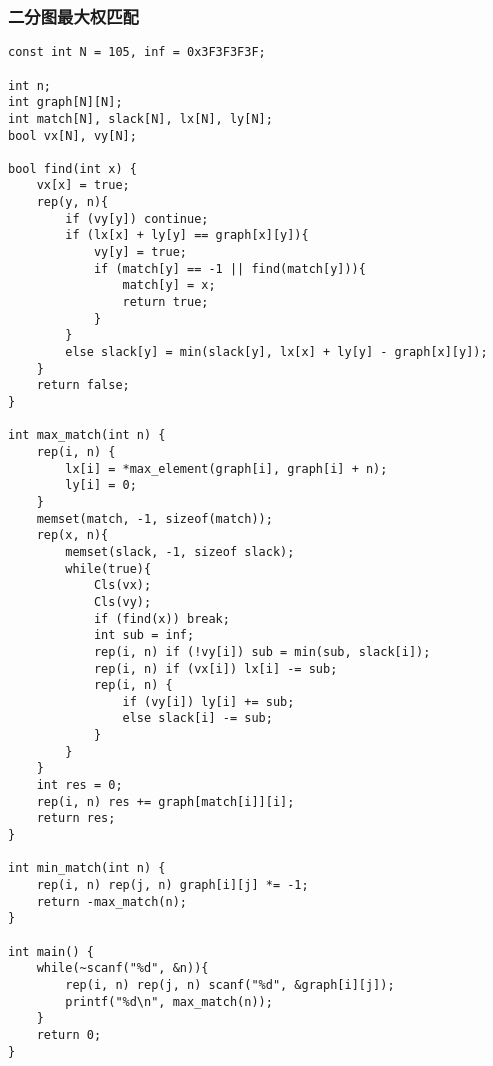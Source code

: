 \subsubsection{二分图最大权匹配}
\begin{verbatim}
const int N = 105, inf = 0x3F3F3F3F;

int n;
int graph[N][N];
int match[N], slack[N], lx[N], ly[N];
bool vx[N], vy[N];

bool find(int x) {
    vx[x] = true;
    rep(y, n){
        if (vy[y]) continue;
        if (lx[x] + ly[y] == graph[x][y]){
            vy[y] = true;
            if (match[y] == -1 || find(match[y])){
                match[y] = x;
                return true;
            }
        }
        else slack[y] = min(slack[y], lx[x] + ly[y] - graph[x][y]);
    }
    return false;
}

int max_match(int n) {
    rep(i, n) {
        lx[i] = *max_element(graph[i], graph[i] + n);
        ly[i] = 0;
    }
    memset(match, -1, sizeof(match));
    rep(x, n){
        memset(slack, -1, sizeof slack);
        while(true){
            Cls(vx);
            Cls(vy);
            if (find(x)) break;
            int sub = inf;
            rep(i, n) if (!vy[i]) sub = min(sub, slack[i]);
            rep(i, n) if (vx[i]) lx[i] -= sub;
            rep(i, n) {
                if (vy[i]) ly[i] += sub;
                else slack[i] -= sub;
            }
        }
    }
    int res = 0;
    rep(i, n) res += graph[match[i]][i];
    return res;
}

int min_match(int n) {
    rep(i, n) rep(j, n) graph[i][j] *= -1;
    return -max_match(n);
}

int main() {
    while(~scanf("%d", &n)){
        rep(i, n) rep(j, n) scanf("%d", &graph[i][j]);
        printf("%d\n", max_match(n));
    }
    return 0;
}
\end{verbatim}
